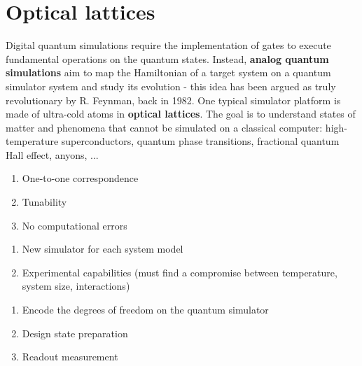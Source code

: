 %
%


\section{Optical lattices} %


Digital quantum simulations require the implementation of gates to execute fundamental operations on the quantum states. Instead, \textbf{analog quantum simulations} aim to map the Hamiltonian of a target system on a quantum simulator system and study its evolution - this idea has been argued as truly revolutionary by R. Feynman, back in 1982. One typical simulator platform is made of ultra-cold atoms in \textbf{optical lattices}. The goal is to understand states of matter and phenomena that cannot be simulated on a classical computer: high-temperature superconductors, quantum phase transitions, fractional quantum Hall effect, anyons, ...


\begin{description}

\item[Advantages]
    \begin{enumerate}
        \item One-to-one correspondence
        \item Tunability
        \item No computational errors
    \end{enumerate} 

\item[Disadvantages] 
    \begin{enumerate} 
        \item New simulator for each system model
        \item Experimental capabilities (must find a compromise between temperature, system size, interactions)
    \end{enumerate} 

\item[Advantages]
    \begin{enumerate} 
        \item Encode the degrees of freedom on the quantum simulator
        \item Design state preparation
        \item Readout measurement
    \end{enumerate} 
    
\end{description}


